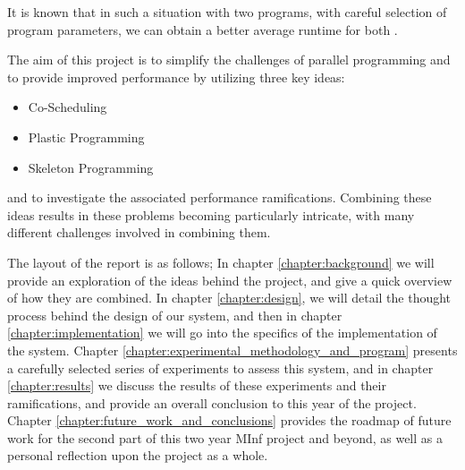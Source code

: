 It is known that in such a situation with two programs, with careful selection of program parameters, we can obtain a better average runtime for both \cite{lira}.

The aim of this project is to simplify the challenges of parallel programming and to provide improved performance by utilizing three key ideas:

\begin{itemize}
	\item Co-Scheduling
	\item Plastic Programming
	\item Skeleton Programming
\end{itemize}

and to investigate the associated performance ramifications. Combining these ideas results in these problems becoming particularly intricate, with many different challenges involved in combining them.

The layout of the report is as follows; In chapter \ref{chapter:background} we will provide an exploration of the ideas behind the project, and give a quick overview of how they are combined. In chapter \ref{chapter:design}, we will detail the thought process behind the design of our system, and then in chapter \ref{chapter:implementation} we will go into the specifics of the implementation of the system. Chapter \ref{chapter:experimental_methodology_and_program} presents a carefully selected series of experiments to assess this system, and in chapter \ref{chapter:results} we discuss the results of these experiments and their ramifications, and provide an overall conclusion to this year of the project. Chapter \ref{chapter:future_work_and_conclusions} provides the roadmap of future work for the second part of this two year MInf project and beyond, as well as a personal reflection upon the project as a whole.
